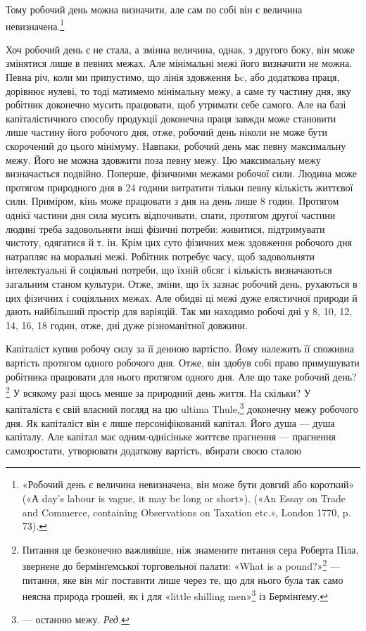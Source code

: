 \parcont{}  %
Тому робочий день можна визначити, але сам по собі він є величина
невизначена.\footnote{
«Робочий день є величина невизначена, він може бути довгий або
короткий» («А day’s labour is vague, it may be long or short»). («An
Essay on Trade and Commerce, containing Observations on Taxation etc.»,
London 1770, p. 73).
}

Хоч робочий день є не стала, а змінна величина, однак, з
другого боку, він може змінятися лише в певних межах. Але мінімальні
межі його визначити не можна. Певна річ, коли ми припустимо,
що лінія здовження Ьc, або додаткова праця, дорівнює
нулеві, то тоді матимемо мінімальну межу, а саме ту частину дня,
яку робітник доконечно мусить працювати, щоб утримати себе
самого. Але на базі капіталістичного способу продукції доконечна
праця завжди може становити лише частину його робочого дня,
отже, робочий день ніколи не може бути скорочений до цього
мінімуму. Навпаки, робочий день має певну максимальну межу.
Його не можна здовжити поза певну межу. Цю максимальну
межу визначається подвійно. Поперше, фізичними межами робочої
сили. Людина може протягом природного дня в 24 години
витратити тільки певну кількість життєвої сили. Приміром, кінь
може працювати з дня на день лише 8 годин. Протягом однієї
частини дня сила мусить відпочивати, спати, протягом другої
частини людині треба задовольняти інші фізичні потреби: живитися,
підтримувати чистоту, одягатися й т. ін. Крім цих суто
фізичних меж здовження робочого дня натрапляє на моральні
межі. Робітник потребує часу, щоб задовольняти інтелектуальні
й соціяльні потреби, що їхній обсяг і кількість визначаються
загальним станом культури. Отже, зміни, що їх зазнає робочий
день, рухаються в цих фізичних і соціяльних межах. Але обидві
ці межі дуже елястичної природи й дають найбільший простір
для варіяцій. Так ми находимо робочі дні у 8, 10, 12, 14, 16, 18
годин, отже, дні дуже різноманітної довжини.

Капіталіст купив робочу силу за її денною вартістю. Йому
належить її споживна вартість протягом одного робочого дня.
Отже, він здобув собі право примушувати робітника працювати
для нього протягом одного дня. Але що таке робочий день?\footnote{
Питання це безконечно важливіше, ніж знамените питання сера
Роберта Піла, звернене до бермінґемської торговельної палати: «What
is a pound?»\footnote*{
Що таке фунт стерлінґів? \emph{Ред.}
} — питання, яке він міг поставити лише через те, що для
нього була так само неясна природа грошей, як і для «little shilling men»\footnote*{
— людців від шилінґів. \emph{Ред.}
}
із Бермінґему.
}
У всякому разі щось менше за природний день життя. На
скільки? У капіталіста є свій власний погляд на цю ultima Thule,\footnote*{
— останню межу. \emph{Ред.}
}
доконечну межу робочого дня. Як капіталіст він є лише персоніфікований
капітал. Його душа — душа капіталу. Але капітал
має одним-однісіньке життєве прагнення — прагнення самозростати,
утворювати додаткову вартість, вбирати своєю сталою
\parbreak{}  %
